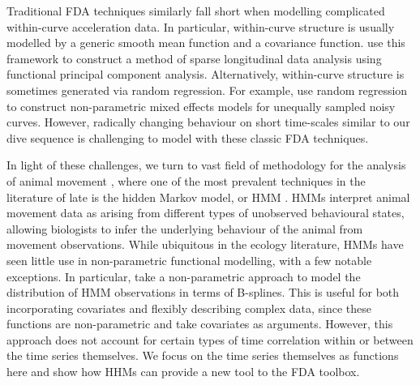 Traditional FDA techniques similarly fall short when modelling complicated within-curve acceleration data. In particular, within-curve structure is usually modelled by a generic smooth mean function and a covariance function. \citet{Yao:2005} use this framework to construct a method of sparse longitudinal data analysis using functional principal component analysis. 
Alternatively, within-curve structure is sometimes generated via random regression. For example, \citet{Rice:2001} use random regression to construct non-parametric mixed effects models for unequally sampled noisy curves. However, radically changing behaviour on short time-scales similar to our dive sequence is challenging to model with these classic FDA techniques.

In light of these challenges, we turn to vast field of methodology for the analysis of animal movement \citep{Hooten:2017}, where one of the most prevalent techniques in the literature of late is the hidden Markov model, or HMM \citep{Patterson:2017,McClintock:2020}. HMMs interpret animal movement data as arising from different types of unobserved behavioural states, allowing biologists to infer the underlying behaviour of the animal from movement observations. While ubiquitous in the ecology literature, HMMs have seen little use in non-parametric functional modelling, with a few notable exceptions. In particular, \citet{Langrock:2018} take a non-parametric approach to model the distribution of HMM observations in terms of B-splines. This is useful for both incorporating covariates and flexibly describing complex data, since these functions are non-parametric and take covariates as arguments. However, this approach does not account for certain types of time correlation within or between the time series themselves. We focus on the time series themselves as functions here and show how HHMs can provide a new tool to the FDA toolbox.

%

